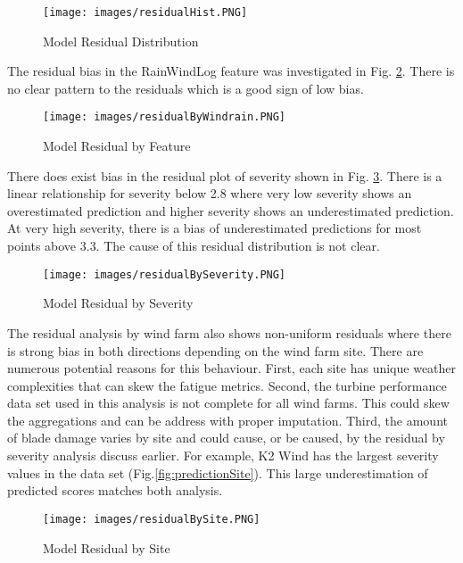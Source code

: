 \documentclass[runningheads]{llncs}
\begin{document}
  \begin{figure}[H]
    \centering
    \texttt{[image: images/residualHist.PNG]}
    \caption{Model Residual Distribution}
    \label{fig:residualHist}
\end{figure}

The residual bias in the RainWindLog feature was investigated in Fig. \ref{fig:residualFeature}. There is no clear pattern to the residuals which is a good sign of low bias. 

  \begin{figure}[H]
    \centering
    \texttt{[image: images/residualByWindrain.PNG]}
    \caption{Model Residual by Feature}
    \label{fig:residualFeature}
\end{figure}

 There does exist bias in the residual plot of severity shown in Fig. \ref{fig:residualSeverity}. There is a linear relationship for severity below 2.8 where very low severity shows an overestimated prediction and higher severity shows an underestimated prediction. At very high severity, there is a bias of underestimated predictions for most points above 3.3. The cause of this residual distribution is not clear. 
 
  \begin{figure}[H]
    \centering
    \texttt{[image: images/residualBySeverity.PNG]}
    \caption{Model Residual by Severity}
    \label{fig:residualSeverity}
\end{figure}

The residual analysis by wind farm also shows non-uniform residuals where there is strong bias in both directions depending on the wind farm site. There are numerous potential reasons for this behaviour. First, each site has unique weather complexities that can skew the fatigue metrics. Second, the turbine performance data set used in this analysis is not complete for all wind farms. This could skew the aggregations and can be address with proper imputation. Third, the amount of blade damage varies by site and could cause, or be caused, by the residual by severity analysis discuss earlier. For example, K2 Wind has the largest severity values in the data set (Fig.\ref{fig:predictionSite}). This large underestimation of predicted scores matches both analysis. 

  \begin{figure}[H]
    \centering
    \texttt{[image: images/residualBySite.PNG]}
    \caption{Model Residual by Site}
    \label{fig:residualSite}
\end{figure}
\end{document}
